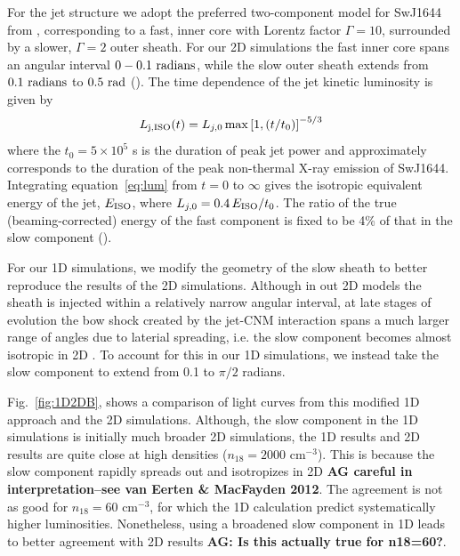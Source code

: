 \documentclass[usenatbib,fleqn]{mnras}
\begin{document}
For the jet structure we adopt the preferred two-component model for
SwJ1644 from \citet{Mimica+2015}, corresponding to a fast, inner core
with Lorentz factor $\Gamma = 10$, surrounded by a slower, $\Gamma=2$
outer sheath.  For our 2D simulations the fast inner core spans an
angular interval $0-0.1\ {\rm radians}$, while the slow outer sheath
extends from $0.1\ {\rm radians}$ to $0.5\ {\rm rad}$
(\citealt{Mimica+2015}).  The time dependence of the jet kinetic
luminosity is given by
\begin{equation}\label{eq:lum}
L_{\rm j, ISO}(t) = L_{j,0}\max\left[1, (t/t_0)\right]^{-5/3}
\end{equation}
%
where the $t_0 = 5\times 10^5$ s is the duration of peak jet power and
approximately corresponds to the duration of the peak non-thermal
X-ray emission of SwJ1644.  Integrating equation~\ref{eq:lum} from $t
= 0$ to $\infty$ gives the isotropic equivalent energy of the jet,
$E_{\rm ISO}$, where $L_{j,0}=0.4\, E_{\rm ISO}/t_0$.  The ratio of
the true (beaming-corrected) energy of the fast component is fixed to
be 4\% of that in the slow component (\citealt{Mimica+2015}).

For our 1D simulations, we modify the geometry of the slow sheath to
better reproduce the results of the 2D simulations.  Although in out
2D models the sheath is injected within a relatively narrow angular
interval, at late stages of evolution the bow shock created by the
jet-CNM interaction spans a much larger range of angles due to
laterial spreading, i.e. the slow component becomes almost isotropic
in 2D \citep[bottom two panels of Fig.~8 in][]{Mimica+2015}. To
account for this in our 1D simulations, we instead take the slow
component to extend from 0.1 to $\pi/2$ radians.

Fig.~\ref{fig:1D2DB}, shows a comparison of light curves from this
modified 1D approach and the 2D simulations. Although, the slow
component in the 1D simulations is initially much broader 2D
simulations, the 1D results and 2D results are quite close at high
densities ($n_{18}=2000$ cm$^{-3}$). This is because the slow
component rapidly spreads out and isotropizes in 2D {\bf AG careful in
  interpretation--see van Eerten & MacFayden 2012}. The agreement is
not as good for $n_{18}=60$ cm$^{-3}$, for which the 1D calculation
predict systematically higher luminosities. Nonetheless, using a
broadened slow component in 1D leads to better agreement with 2D
results {\bf AG: Is this actually true for n18=60?}.

\end{document}
